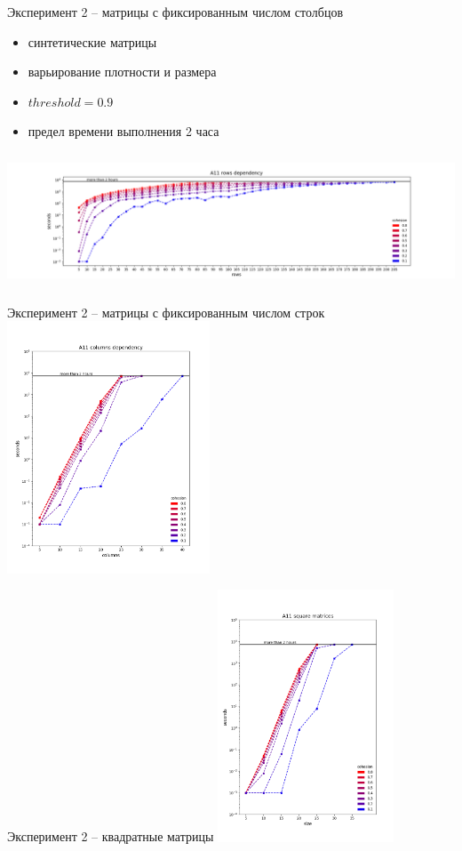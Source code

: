 \documentclass[10pt, dvipsnames]{beamer}
\begin{document}
\begin{frame}{Эксперимент 2 -- матрицы с фиксированным числом столбцов}

	\begin{itemize}
	\item синтетические матрицы
	\item варьирование плотности и размера
	\item $threshold = 0.9$
	\item предел времени выполнения 2 часа
	\end{itemize}
\vspace*{+0.5cm}\hspace*{-1.5cm}\includegraphics[width=14cm, height=4cm]{./images/A11-X-20.png}
\end{frame}

\begin{frame}{Эксперимент 2 -- матрицы с фиксированным числом строк}
\includegraphics[width=\textwidth, height=7.5cm]{./images/A11-20-X.png}
\end{frame}

\begin{frame}{Эксперимент 2 -- квадратные матрицы}
\includegraphics[width=\textwidth, height=7.5cm]{./images/A11-square.png}
\end{frame}
\end{document}
